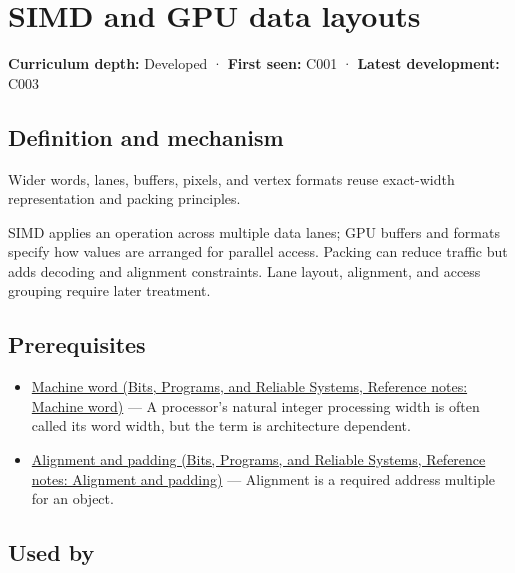 \hypertarget{appendix-3c7b1a56de01}{}\label{referencestart:appendix-3c7b1a56de01}
\section{SIMD and GPU data layouts}\label{appendix-3c7b1a56de01-simd-and-gpu-data-layouts}

\textbf{Curriculum depth:} Developed · \textbf{First seen:} C001 · \textbf{Latest development:} C003

\subsection{Definition and mechanism}\label{appendix-3c7b1a56de01-definition-and-mechanism}

Wider words, lanes, buffers, pixels, and vertex formats reuse exact-width representation and packing principles.

SIMD applies an operation across multiple data lanes; GPU buffers and formats specify how values are arranged for parallel access. Packing can reduce traffic but adds decoding and alignment constraints. Lane layout, alignment, and access grouping require later treatment.

\subsection{Prerequisites}\label{appendix-3c7b1a56de01-prerequisites}

\begin{itemize}
\tightlist
\item
  \href{../01-Bits-Programs-and-Reliable-Systems/main.pdf\#nameddest=appendix-d67a19507dc5}{Machine word (Bits, Programs, and Reliable Systems, Reference notes: Machine word)} --- A processor's natural integer processing width is often called its word width, but the term is architecture dependent.
\item
  \href{../01-Bits-Programs-and-Reliable-Systems/main.pdf\#nameddest=appendix-a1f7c53b4742}{Alignment and padding (Bits, Programs, and Reliable Systems, Reference notes: Alignment and padding)} --- Alignment is a required address multiple for an object.
\end{itemize}

\subsection{Used by}\label{appendix-3c7b1a56de01-used-by}

